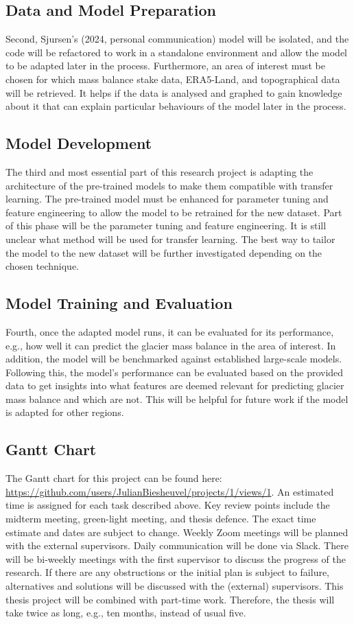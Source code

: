 \subsection{Data and Model Preparation}
Second, Sjursen's (2024, personal communication) model will be isolated, and the code will be refactored to work in a standalone environment and allow the model to be adapted later in the process. Furthermore, an area of interest must be chosen for which mass balance stake data, ERA5-Land, and topographical data will be retrieved. It helps if the data is analysed and graphed to gain knowledge about it that can explain particular behaviours of the model later in the process. 

\subsection{Model Development}
The third and most essential part of this research project is adapting the architecture of the pre-trained models to make them compatible with transfer learning. The pre-trained model must be enhanced for parameter tuning and feature engineering to allow the model to be retrained for the new dataset. Part of this phase will be the parameter tuning and feature engineering. It is still unclear what method will be used for transfer learning. The best way to tailor the model to the new dataset will be further investigated depending on the chosen technique. 

\subsection{Model Training and Evaluation}
Fourth, once the adapted model runs, it can be evaluated for its performance, e.g., how well it can predict the glacier mass balance in the area of interest. In addition, the model will be benchmarked against established large-scale models. Following this, the model's performance can be evaluated based on the provided data to get insights into what features are deemed relevant for predicting glacier mass balance and which are not. This will be helpful for future work if the model is adapted for other regions.

\subsection{Gantt Chart}
The Gantt chart for this project can be found here: \url{https://github.com/users/JulianBiesheuvel/projects/1/views/1}. An estimated time is assigned for each task described above. Key review points include the midterm meeting, green-light meeting, and thesis defence. The exact time estimate and dates are subject to change. Weekly Zoom meetings will be planned with the external supervisors. Daily communication will be done via Slack. There will be bi-weekly meetings with the first supervisor to discuss the progress of the research. If there are any obstructions or the initial plan is subject to failure, alternatives and solutions will be discussed with the (external) supervisors. This thesis project will be combined with part-time work. Therefore, the thesis will take twice as long, e.g., ten months, instead of usual five.